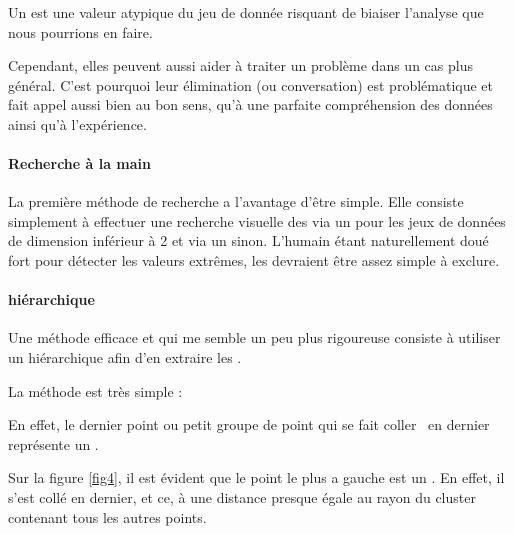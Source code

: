 \subsubsection{}
Un  est une valeur atypique du jeu de donnée risquant de biaiser l'analyse que nous pourrions en faire. 

Cependant, elles peuvent aussi aider à traiter un problème dans un cas plus général. C'est pourquoi leur élimination (ou conversation) est problématique et fait appel aussi bien au bon sens, qu'à une parfaite compréhension des données ainsi qu'à l'expérience.

\paragraph{Recherche \og à la main\fg}
La première méthode de recherche a l'avantage d'être simple. Elle consiste simplement à effectuer une recherche visuelle des  via un  pour les jeux de données de dimension inférieur à 2 et via un  sinon. L'humain étant naturellement doué fort pour détecter les valeurs extrêmes, les  devraient être assez simple à exclure. 

\begin{minipage}{\textwidth}
\begin{multicols}{2}
	 \columnbreak
\end{multicols}
\end{minipage}

\paragraph{ hiérarchique}
Une méthode efficace et qui me semble un peu plus rigoureuse consiste à utiliser un  hiérarchique afin d'en extraire les .

La méthode est très simple :  

En effet, le dernier point ou petit groupe de point qui se fait \og coller\fg~ en dernier représente un .

Sur la figure \ref{fig4}, il est évident que le point le plus a gauche est un . En effet, il s'est collé en dernier, et ce, à une distance presque égale au rayon du cluster contenant tous les autres points.

